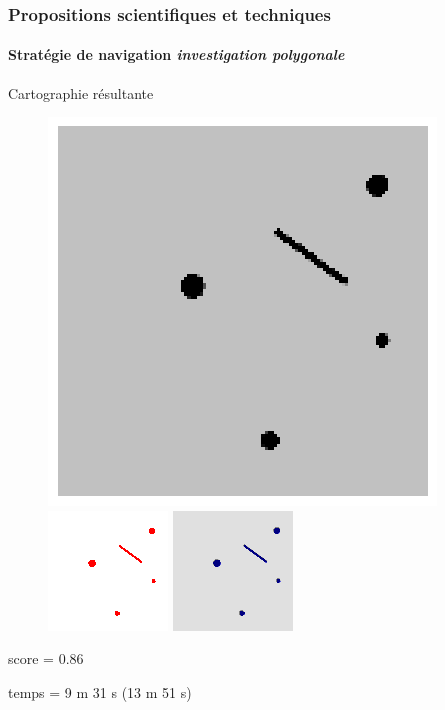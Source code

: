 \documentclass{beamer}
\begin{document}
			\begin{frame}
				\frametitle{Propositions scientifiques et techniques}
				\framesubtitle{Stratégie de navigation \textit{investigation polygonale}}
				Cartographie résultante
				\begin{figure}
					\centering
					\includegraphics[width=0.3\linewidth]{graphics/test_05_flip.png}
					\includegraphics[width=0.3\linewidth]{graphics/occupancy_grid_example_ip.png}
					\includegraphics[width=0.3\linewidth]{graphics/both_example_ip.png}
				\end{figure}
				score = 0.86

				temps = 9 m 31 s (13 m 51 s)
			\end{frame}
\end{document}
